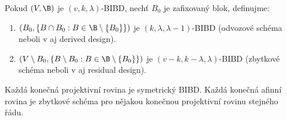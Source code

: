 \begin{definition}
	Pokud $(V, \B)$ je $(v, k, \lambda)$-BIBD, nechť $B_0$ je zafixovaný blok, definujme:
	\begin{enumerate}
		\item $(B_0, \{ B \cap B_0 : B \in \B \setminus \{ B_0 \} \})$ je $(k, \lambda, \lambda - 1)$-BIBD (odvozové schéma neboli v aj derived design).
		\item $(V \setminus B_0, \{ B \setminus B_0: B \in \B \setminus \{ B_0 \} \})$ je $(v - k, k - \lambda, \lambda)$-BIBD (zbytkové schéma neboli v aj residual design).
	\end{enumerate}
\end{definition}

\begin{example}\label{kpr_bibd}
	Každá konečná projektivní rovina je symetrický BIBD. Každá konečná afinní rovina je zbytkové schéma pro nějakou konečnou projektivní rovinu stejného řádu.
\end{example}
